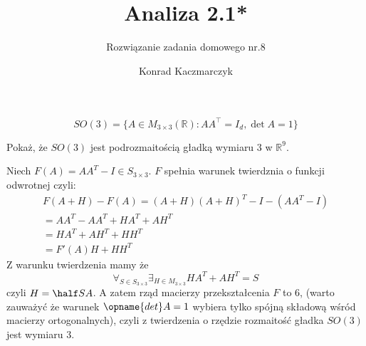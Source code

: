 \documentclass[11pt]{scrartcl}
\author{Konrad Kaczmarczyk}
\begin{document}
  \title{Analiza 2.1*}
  \subtitle{Rozwiązanie zadania domowego nr.8}
  \maketitle
    \begin{zadanie*}
      \[
        SO(3) = \{ A \in M_{3 \times 3}(\mathbb{R}) : A A^\top = I_d, \det A = 1 \}
      \]

      Pokaż, że \( SO(3) \) jest podrozmaitością gładką wymiaru \( 3 \) w \( \mathbb{R}^9 \).
    \end{zadanie*}

    Niech $F(A) = A A^T - I \in S_{3 \times 3}$. $F$ spełnia warunek twierdznia o funkcji odwrotnej czyli:
    \begin{gather*}
        F (A + H) - F(A) = (A + H) (A + H)^T - I - (AA^T - I) \\ = AA^T - AA^T + HA^T + AH^T \\ = HA^T + AH^T + HH^T \\ = F'(A) H + HH^T
    \end{gather*}
    Z warunku twierdzenia mamy że
    \[
      \forall_{S \in S_{3 \times 3}} \exists_{H \in M_{3 \times 3}} HA^T + AH^T = S
    \]
    czyli $H = \half S A$. A zatem rząd macierzy przekształcenia $F$ to $6$, (warto zauważyć że warunek $\opname{det} A = 1$ wybiera tylko spójną składową wśród macierzy ortogonalnych), czyli z twierdzenia o rzędzie rozmaitość gładka $SO(3)$ jest wymiaru $3$. 

    
\end{document}
